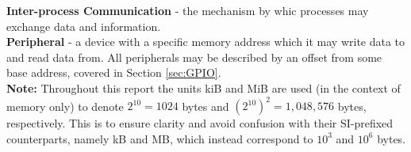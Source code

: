     \noindent \textbf{Inter-process Communication} - the mechanism by whic
    processes may exchange data and information. \\
        
    \noindent \textbf{Peripheral} - a device with a specific memory address
    which it may write data to and read data from. All peripherals may be
    described by an offset from some base address, covered in Section
    \ref{sec:GPIO}. \\

    \noindent\textbf{Note:} Throughout this report the units kiB and MiB are
    used (in the context of memory only) to denote $2^{10} = 1024$ bytes and
    $(2^{10})^2=1,048,576$ bytes, respectively.  This is to ensure clarity and
    avoid confusion with their SI-prefixed counterparts, namely kB and MB, which
    instead correspond to $10^3$ and $10^6$ bytes.
